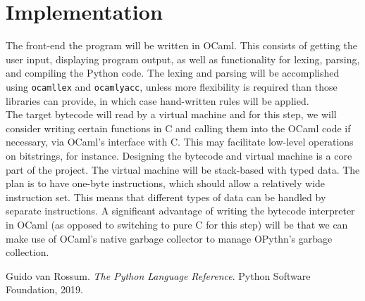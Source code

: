 \documentclass[11pt, A4, twoside]{article}
\newcommand{\ms}{\texttt}
\begin{document}
\section{Implementation}
The front-end the program will be written in OCaml. This consists of getting the user input, displaying program output, as well as functionality for lexing, parsing, and compiling the Python code. The lexing and parsing will be accomplished using \ms{ocamllex} and \ms{ocamlyacc}, unless more flexibility is required than those libraries can provide, in which case hand-written rules will be applied.\\
\indent The target bytecode will read by a virtual machine and for this step, we will consider writing certain functions in C and calling them into the OCaml code if necessary, via OCaml's interface with C. This may facilitate low-level operations on bitstrings, for instance. Designing the bytecode and virtual machine is a core part of the project. The virtual machine will be stack-based with typed data. The plan is to have one-byte instructions, which should allow a relatively wide instruction set. This means that different types of data can be handled by separate instructions. A significant advantage of writing the bytecode interpreter in OCaml (as opposed to switching to pure C for this step) will be that we can make use of OCaml's native garbage collector to manage OPythn's garbage collection.

\begin{thebibliography}{1}
     Guido van Rossum. \textit{The Python Language Reference}. Python Software Foundation, 2019.
\end{thebibliography}
\end{document}

